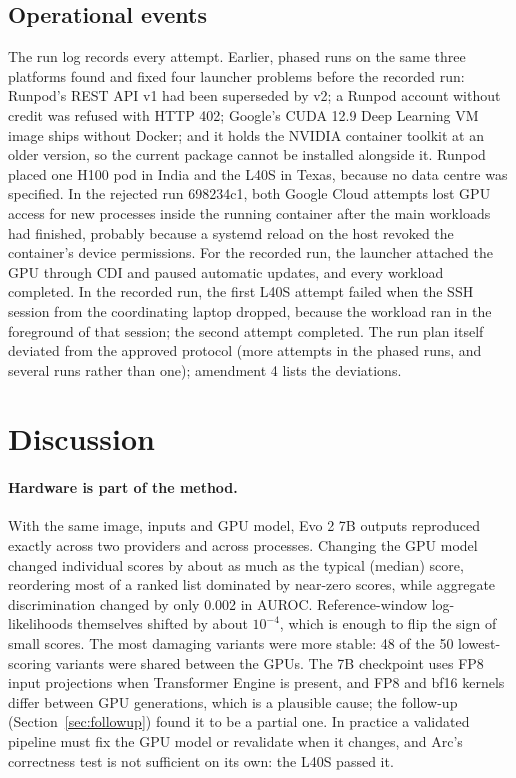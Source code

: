 \documentclass[11pt]{article}
\begin{document}
\subsection{Operational events}
The run log records every attempt. Earlier, phased runs on the same three platforms found and
fixed four launcher problems before the recorded run: Runpod's REST API v1 had been superseded by
v2; a Runpod account without credit was refused with HTTP 402; Google's CUDA 12.9 Deep Learning VM
image ships without Docker; and it holds the NVIDIA container toolkit at an older version, so the
current package cannot be installed alongside it. Runpod placed one H100 pod in India and the L40S
in Texas, because no data centre was specified.
In the rejected run 698234c1, both Google Cloud attempts lost GPU access for new processes inside
the running container after the main workloads had finished, probably because a systemd reload on
the host revoked the container's device permissions. For the recorded run, the launcher attached
the GPU through CDI and paused automatic updates, and every workload completed. In the recorded
run, the first L40S attempt failed when the SSH session from the coordinating laptop dropped,
because the workload ran in the foreground of that session; the second attempt completed. The run
plan itself deviated from the approved protocol (more attempts in the phased runs, and several
runs rather than one); amendment 4 lists the deviations.

\section{Discussion}
\paragraph{Hardware is part of the method.} With the same image, inputs and GPU model, Evo 2 7B
outputs reproduced exactly across two providers and across processes. Changing the GPU model
changed individual scores by about as much as the typical (median) score, reordering most of a
ranked list dominated by near-zero scores, while aggregate discrimination changed by only 0.002 in
AUROC. Reference-window log-likelihoods themselves shifted by about $10^{-4}$, which is enough to
flip the sign of small scores. The most damaging variants were more stable: 48 of the 50
lowest-scoring variants were shared between the GPUs. The 7B checkpoint uses FP8 input projections
when Transformer Engine is present, and FP8 and bf16 kernels differ between GPU generations, which
is a plausible cause; the follow-up (Section~\ref{sec:followup}) found it to be a partial one. In practice a validated pipeline must fix the GPU model
or revalidate when it changes, and Arc's correctness test is not sufficient on its own: the L40S
passed it.
\end{document}
